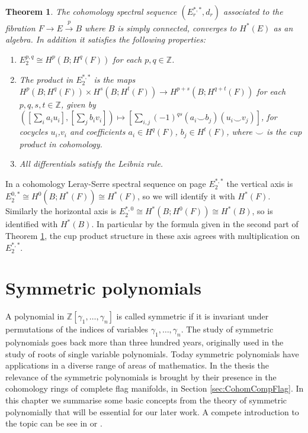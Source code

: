 \documentclass{article}
\theoremstyle{plain}
\newtheorem{thm}{Theorem}[section]
\theoremstyle{definition}
\numberwithin{thm}{section}
\begin{document}
		\begin{thm}\label{thm:SSS}
		The cohomology spectral sequence $(E_{r}^{*,*},d_{r})$ associated to the fibration $F \to E \xrightarrow{p} B$ where $B$ is simply connected,
		converges to $H^{*}(E)$ as an algebra.
		In addition it satisfies the following properties:
		\begin{enumerate}
			\item $E_{2}^{p,q} \cong H^{p}(B;H^{q}(F))$ for each $p,q \in \mathbb{Z}$.
			\item The product in $E_{2}^{*,*}$ is the maps $H^{p}(B;H^{q}(F)) \times H^{s}(B;H^{t}(F)) \to H^{p+s}(B;H^{q+t}(F))$ for each $p,q,s,t \in \mathbb{Z}$,
			given by $([\sum_{i}{a_i u_i}],[\sum_{j}{b_i v_i}]) \mapsto [\sum_{i,j}{(-1)^{qs}(a_{i}\smallsmile b_{j})(u_{i}\smallsmile v_{j})}]$,
			for cocycles $u_i$,$v_i$ and coefficients $a_i \in H^{q}(F)$, $b_j \in H^{t}(F)$, where $\smallsmile$ is the cup product in cohomology.
			\item All differentials satisfy the Leibniz rule.
		\end{enumerate}
		\end{thm}

		In a cohomology Leray-Serre spectral sequence on page $E^{*,*}_{2}$ the vertical axis is $E_{2}^{0,*}\cong H^{0}(B;H^{*}(F)) \cong H^{*}(F)$,
		so we will identify it with $H^{*}(F)$.
		Similarly the horizontal axis is $E_{2}^{*,0}\cong H^{*}(B;H^{0}(F)) \cong H^{*}(B)$, so is identified with $H^{*}(B)$.
		In particular by the formula given in the second part of Theorem \ref{thm:SSS}, the cup product structure in these axis agrees with multiplication on $E_{2}^{*,*}$.

\newpage
\section{Symmetric polynomials}\label{sec:SymPoly}

	A polynomial in $\mathbb{Z}[\gamma_1,\dots,\gamma_n]$ is called symmetric if it is invariant under permutations of the indices of variables $\gamma_1,\dots,\gamma_n$.
	The study of symmetric polynomials goes back more than three hundred years, originally used in the study of roots of single variable polynomials.
	Today symmetric polynomials have applications in a diverse range of areas of mathematics.
	In the thesis the relevance of the symmetric polynomials is brought by their presence in the cohomology rings of complete flag manifolds,
	in Section \ref{sec:CohomCompFlag}.
	In this chapter we summarise some basic concepts from the theory of symmetric polynomially that will be essential for our later work.
	A compete introduction to the topic can be see in \cite[\S $7$]{ECstanly} or \cite[\S $I$]{Macdonald}.
	
\end{document}
